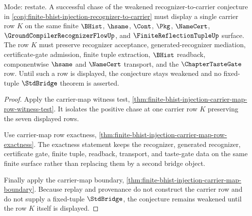 \begin{theorem}
\label{thm:finite-bhist-injection-carrier-map-witness-row}
Mode: restate. A successful chase of the weakened recognizer-to-carrier conjecture in \autoref{conj:finite-bhist-injection-recognizer-to-carrier} must display a single carrier row $K$ on the same finite $\BHist$, $\hsame$, $\Cont$, $\Pkg$, $\NameCert$, $\GroundCompilerRecognizerFlowUp$, and $\FiniteReflectionTupleUp$ surface. The row $K$ must preserve recognizer acceptance, generated-recognizer mediation, certificate-gate admission, finite tuple extraction, $\BHist$ readback, componentwise $\hsame$ and $\NameCert$ transport, and the $\ChapterTasteGate$ row. Until such a row is displayed, the conjecture stays weakened and no fixed-tuple $\StdBridge$ theorem is asserted.
\end{theorem}
\begin{proof}
Apply the carrier-map witness test, \autoref{thm:finite-bhist-injection-carrier-map-row-witness-test}. It isolates the positive chase at one carrier row $K$ preserving the seven displayed rows.

Use carrier-map row exactness, \autoref{thm:finite-bhist-injection-carrier-map-row-exactness}. The exactness statement keeps the recognizer, generated recognizer, certificate gate, finite tuple, readback, transport, and taste-gate data on the same finite surface rather than replacing them by a second bridge object.

Finally apply the carrier-map boundary, \autoref{thm:finite-bhist-injection-carrier-map-boundary}. Because replay and provenance do not construct the carrier row and do not supply a fixed-tuple $\StdBridge$, the conjecture remains weakened until the row $K$ itself is displayed.
\end{proof}

